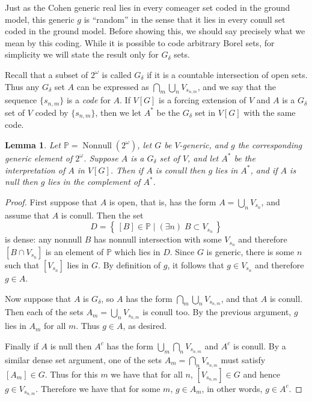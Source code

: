 \documentclass[11pt,oneside]{amsbook}
\newcommand{\set}[1]{\left\{\,#1\,\right\}}
\newcommand{\PP}{\mathbb P}
\DeclareMathOperator{\Nonnull}{Nonnull}
\theoremstyle{definition}
\theoremstyle{plain}
\newtheorem{lem}[thm]{Lemma}
\theoremstyle{definition}
\theoremstyle{remark}
\numberwithin{equation}{section}
\numberwithin{figure}{section}
\begin{document}
Just as the Cohen generic real lies in every comeager set coded in the ground model, this generic $g$ is ``random'' in the sense that it lies in every conull set coded in the ground model. Before showing this, we should say precisely what we mean by this coding. While it is possible to code arbitrary Borel sets, for simplicity we will state the result only for $G_\delta$ sets. 

Recall that a subset of $2^\omega$ is called $G_\delta$ if it is a countable intersection of open sets. Thus any $G_\delta$ set $A$ can be expressed as $\bigcap_m\bigcup_nV_{s_{n,m}}$, and we say that the sequence $\{s_{n,m}\}$ is a \emph{code} for $A$. If $V[G]$ is a forcing extension of $V$ and $A$ is a $G_\delta$ set of $V$ coded by $\{s_{n,m}\}$, then we let $A^*$ be the $G_\delta$ set in $V[G]$ with the same code.

\begin{lem}
  \label{lem:random-conull}
  Let $\PP=\Nonnull(2^\omega)$, let $G$ be $V$-generic, and $g$ the corresponding generic element of $2^\omega$. Suppose $A$ is a $G_\delta$ set of $V$, and let $A^*$ be the interpretation of $A$ in $V[G]$. Then if $A$ is conull then $g$ lies in $A^*$, and if $A$ is null then $g$ lies in the complement of $A^*$.
\end{lem}

\begin{proof}
  First suppose that $A$ is open, that is, has the form $A=\bigcup_nV_{s_n}$, and assume that $A$ is conull. Then the set
  \[D=\set{[B]\in\PP\mid (\exists n)\;B\subset V_{s_n}}
  \]
  is dense: any nonnull $B$ has nonnull intersection with some $V_{s_n}$ and therefore $[B\cap V_{s_n}]$ is an element of $\PP$ which lies in $D$. Since $G$ is generic, there is some $n$ such that $[V_{s_n}]$ lies in $G$. By definition of $g$, it follows that $g\in V_{s_n}$ and therefore $g\in A$.

  Now suppose that $A$ is $G_\delta$, so $A$ has the form $\bigcap_m\bigcup_nV_{s_{n,m}}$, and that $A$ is conull. Then each of the sets $A_m=\bigcup_nV_{s_{n,m}}$ is conull too. By the previous argument, $g$ lies in $A_m$ for all $m$. Thus $g\in A$, as desired.

  Finally if $A$ is null then $A^c$ has the form $\bigcup_m\bigcap_nV_{s_{n,m}}$ and $A^c$ is conull. By a similar dense set argument, one of the sets $A_m=\bigcap_nV_{s_{n,m}}$ must satisfy $[A_m]\in G$. Thus for this $m$ we have that for all $n$, $[V_{s_{n,m}}]\in G$ and hence $g\in V_{s_{n,m}}$. Therefore we have that for some $m$, $g\in A_m$, in other words, $g\in A^c$.
\end{proof}
\end{document}
